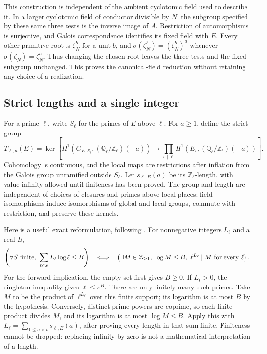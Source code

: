 This construction is independent of the ambient cyclotomic field used
to describe it. In a larger cyclotomic field of conductor divisible by
\(N\), the subgroup specified by these same three tests is the inverse
image of \(A\). Restriction of automorphisms is surjective, and Galois
correspondence identifies its fixed field with \(E\).
Every other primitive root is \(\zeta_N^b\) for a unit \(b\), and
\(\sigma(\zeta_N^b)=(\zeta_N^b)^a\) whenever
\(\sigma(\zeta_N)=\zeta_N^a\).
Thus changing the chosen root leaves the three tests and the fixed
subgroup unchanged. This proves the canonical-field reduction without
retaining any choice of a realization.

\subsection{Strict lengths and a single integer}
For a prime \(\ell\), write \(S_\ell\) for the primes of \(E\) above \(\ell\).
For \(a\geq1\), define the strict group
\[
 T_{\ell,a}(E)=\ker\left[
 H^1(G_{E,S_\ell},(\mathbb Q_\ell/\mathbb Z_\ell)(-a))
 \longrightarrow
 \prod_{v\mid\ell}H^1(E_v,(\mathbb Q_\ell/\mathbb Z_\ell)(-a))\right].
\]
Cohomology is continuous, and the local maps are restrictions after
inflation from the Galois group unramified outside \(S_\ell\).
Let \(s_{\ell,E}(a)\) be its \(\mathbb Z_\ell\)-length, with value infinity
allowed until finiteness has been proved.
The group and length are independent of choices of closures and primes
above local places: field isomorphisms induce isomorphisms of global
and local groups, commute with restriction, and preserve these kernels.

Here is a useful exact reformulation, following .
For nonnegative integers \(L_\ell\) and a real \(B\),
\begin{equation}\label{eq:sr-integerbudget}
 \left(\forall S\ {\rm finite},\ \sum_{\ell\in S}L_\ell\log\ell\leq B\right)
 \quad\Longleftrightarrow\quad
 \left(\exists M\in\mathbb Z_{\geq1},\
 \log M\leq B,\ \ell^{L_\ell}\mid M\ {\rm for\ every}\ \ell\right).
\end{equation}
For the forward implication, the empty set first gives \(B\geq0\).
If \(L_\ell>0\), the singleton inequality gives \(\ell\leq e^B\).
There are only finitely many such primes. Take \(M\) to be the product
of \(\ell^{L_\ell}\) over this finite support; its logarithm is at most
\(B\) by the hypothesis. Conversely, distinct prime powers are coprime,
so each finite product divides \(M\), and its logarithm is at most
\(\log M\leq B\).
Apply this with \(L_\ell=\sum_{1\leq a<t}s_{\ell,E}(a)\), after proving
every length in that sum finite.
Finiteness cannot be dropped: replacing infinity by zero is not a
mathematical interpretation of a length.

